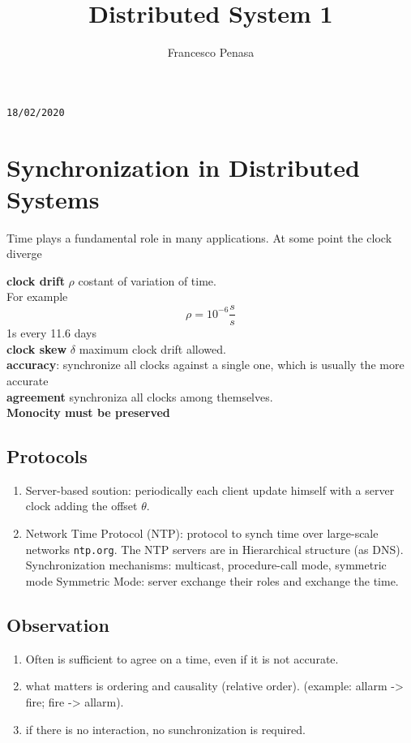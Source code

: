 \documentclass[11pt]{article}
\begin{document}
\author{Francesco Penasa}
\title{Distributed System 1}
\maketitle

\medskip

\texttt{18/02/2020}
\section{Synchronization in Distributed Systems} %
\label{sec:synchronization_in_distributed_systems}
Time plays a fundamental role in many applications.
At some point the clock diverge

\textbf{clock drift} $\rho$ costant of variation of time.\\
For example \[
	\rho = 10 ^{-6} \frac{s}{s}
\] 1s every 11.6 days\\
\textbf{clock skew} $\delta$ maximum clock drift allowed.\\

\textbf{accuracy}: synchronize all clocks against a single one, which is usually the more accurate\\
\textbf{agreement} synchroniza all clocks among themselves.\\
\textbf{Monocity must be preserved}

\subsection{Protocols} %
\label{ssub:protocols}
\begin{enumerate}
	\item Server-based soution: periodically each client update himself with a server clock adding the offset $\theta$.

	\item Network Time Protocol (NTP): protocol to synch time over large-scale networks \texttt{ntp.org}. The NTP servers are in Hierarchical structure (as DNS). Synchronization mechanisms: multicast, procedure-call mode, symmetric mode
	Symmetric Mode: server exchange their roles and exchange the time.
\end{enumerate}

\subsection{Observation} %
\label{sub:observation}
\begin{enumerate}
	\item Often is sufficient to agree on a time, even if it is not accurate.
	\item what matters is ordering and causality (relative order). (example: allarm -> fire; fire -> allarm).
	\item if there is no interaction, no sunchronization is required.
\end{enumerate}
\end{document}
